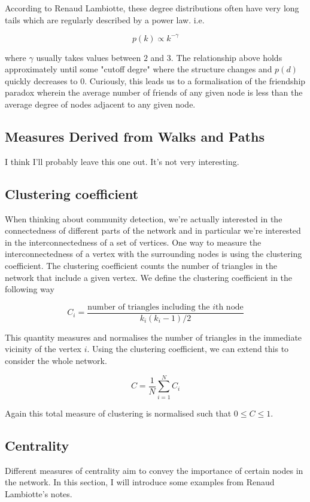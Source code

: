 According to Renaud Lambiotte, these degree distributions often have very long tails which are regularly described by a power law. i.e.

$$ p(k) \propto k^{-\gamma} $$

where $\gamma$ usually takes values between $2$ and $3$.\cite[16]{oxford:renaud_notes} The relationship above holds approximately until some "cutoff degre" where the structure changes and $p(d)$ quickly decreases to $0$. Curiously, this leads us to a formalisation of the friendship paradox wherein the average number of friends of any given node is less than the average degree of nodes adjacent to any given node. 

\subsection{Measures Derived from Walks and Paths}
I think I'll probably leave this one out. It's not very interesting.

\subsection{Clustering coefficient}
When thinking about community detection, we're actually interested in the connectedness of different parts of the network and in particular we're interested in the interconnectedness of a set of vertices. One way to measure the interconnectedness of a vertex with the surrounding nodes is using the clustering coefficient. The clustering coefficient counts the number of triangles in the network that include a given vertex. We define the clustering coefficient in the following way

$$ C_i = \frac{\text{number of triangles including the }i\text{th node}}{k_i(k_i-1)/2} $$

This quantity measures and normalises the number of triangles in the immediate vicinity of the vertex $i$. Using the clustering coefficient, we can extend this to consider the whole network.

$$ C = \frac{1}{N}\sum_{i=1}^NC_i $$

Again this total measure of clustering is normalised such that $0 \leq C \leq 1$.

\subsection{Centrality}
Different measures of centrality aim to convey the importance of certain nodes in the network. In this section, I will introduce some examples from Renaud Lambiotte's notes.\cite[19]{oxford:renaud_notes}

